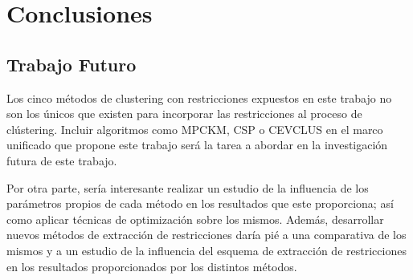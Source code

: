 \chapter{Conclusiones}\label{ch:Conclusiones}

\section{Trabajo Futuro}

Los cinco métodos de clustering con restricciones expuestos en este trabajo no son los únicos que existen para incorporar las restricciones al proceso de clústering. Incluir algoritmos como \acf{MPCKM}, \acf{CSP} o \acf{CEVCLUS} en el marco unificado que propone este trabajo será la tarea a abordar en la investigación futura de este trabajo.

Por otra parte, sería interesante realizar un estudio de la influencia de los parámetros propios de cada método en los resultados que este proporciona; así como aplicar técnicas de optimización sobre los mismos. Además, desarrollar nuevos métodos de extracción de restricciones daría pié a una comparativa de los mismos y a un estudio de la influencia del esquema de extracción de restricciones en los resultados proporcionados por los distintos métodos.